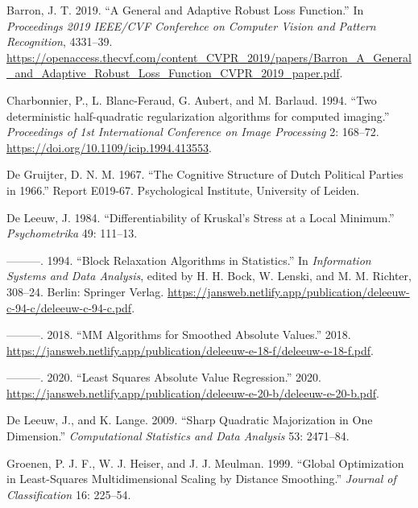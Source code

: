 \documentclass[
  12pt,
  letterpaper,
  DIV=11,
  numbers=noendperiod]{scrartcl}
\newlength{\cslhangindent}
\newenvironment{CSLReferences}[2] %
 {\begin{list}{}{%
  \setlength{\itemindent}{0pt}
  \setlength{\leftmargin}{0pt}
  \setlength{\parsep}{0pt}
  \ifodd #1
   \setlength{\leftmargin}{\cslhangindent}
   \setlength{\itemindent}{-1\cslhangindent}
  \fi
  \setlength{\itemsep}{#2\baselineskip}}}
 {\end{list}}
\begin{document}
\label{refs}
\begin{CSLReferences}{1}{0}
Barron, J. T. 2019. {``A General and Adaptive Robust Loss Function.''}
In \emph{Proceedings 2019 IEEE/CVF Conferehce on Computer Vision and
Pattern Recognition}, 4331--39.
\url{https://openaccess.thecvf.com/content_CVPR_2019/papers/Barron_A_General_and_Adaptive_Robust_Loss_Function_CVPR_2019_paper.pdf}.

Charbonnier, P., L. Blanc-Feraud, G. Aubert, and M. Barlaud. 1994.
{``{Two deterministic half-quadratic regularization algorithms for
computed imaging}.''} \emph{Proceedings of 1st International Conference
on Image Processing} 2: 168--72.
\url{https://doi.org/10.1109/icip.1994.413553}.

De Gruijter, D. N. M. 1967. {``{The Cognitive Structure of Dutch
Political Parties in 1966}.''} Report E019-67. Psychological Institute,
University of Leiden.

De Leeuw, J. 1984. {``{Differentiability of Kruskal's Stress at a Local
Minimum}.''} \emph{Psychometrika} 49: 111--13.

---------. 1994. {``{Block Relaxation Algorithms in Statistics}.''} In
\emph{Information Systems and Data Analysis}, edited by H. H. Bock, W.
Lenski, and M. M. Richter, 308--24. Berlin: Springer Verlag.
\url{https://jansweb.netlify.app/publication/deleeuw-c-94-c/deleeuw-c-94-c.pdf}.

---------. 2018. {``{MM Algorithms for Smoothed Absolute Values}.''}
2018.
\url{https://jansweb.netlify.app/publication/deleeuw-e-18-f/deleeuw-e-18-f.pdf}.

---------. 2020. {``{Least Squares Absolute Value Regression}.''} 2020.
\url{https://jansweb.netlify.app/publication/deleeuw-e-20-b/deleeuw-e-20-b.pdf}.

De Leeuw, J., and K. Lange. 2009. {``Sharp Quadratic Majorization in One
Dimension.''} \emph{Computational Statistics and Data Analysis} 53:
2471--84.

Groenen, P. J. F., W. J. Heiser, and J. J. Meulman. 1999. {``{Global
Optimization in Least-Squares Multidimensional Scaling by Distance
Smoothing}.''} \emph{Journal of Classification} 16: 225--54.


\end{CSLReferences}
\end{document}
